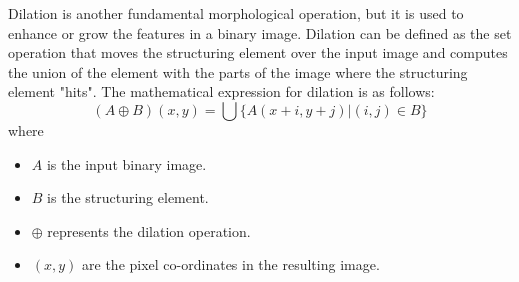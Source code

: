 Dilation is another fundamental morphological operation, but it is used to enhance or grow the features in a binary image. Dilation can be defined as the set operation that moves the structuring element over the input image and computes the union of the element with the parts of the image where the structuring element "hits". The mathematical expression for dilation is as follows:
\begin{equation}
    (A \oplus B)(x, y) = \bigcup \{A(x + i, y + j) | (i, j) \in B\}
    \label{eq:dilation}
\end{equation}
where
\begin{itemize}
    \item $A$ is the input binary image.
    \item $B$ is the structuring element.
    \item $\oplus$ represents the dilation operation.
    \item $(x, y)$ are the pixel co-ordinates in the resulting image.
\end{itemize}

